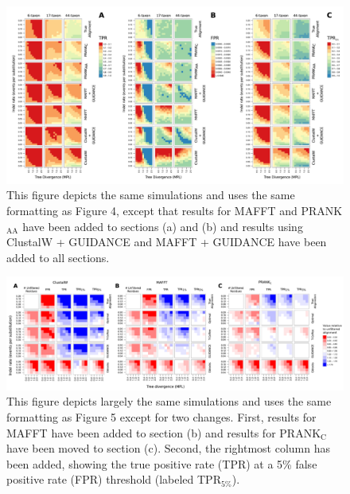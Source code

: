\documentclass{article}
\newcommand{\pranka}{PRANK$_{\textrm{AA}}$\xspace}
\newcommand{\prankc}{PRANK$_{\textrm{C}}$\xspace}
\newcommand{\tprf}{TPR$_{5\%}$\xspace}
\begin{document}
\makeatletter 
\renewcommand{\figurename}{Supplementary Figure}
\renewcommand{\thefigure}{S\@arabic\c@figure} 

\begin{figure}[t]
\begin{center}
\includegraphics[scale=0.7]{supp_fig1.pdf}
\end{center}
\caption{This figure depicts the same simulations and uses the same
  formatting as Figure 4, except that results for MAFFT and \pranka
  have been added to sections (a) and (b) and results using ClustalW +
  GUIDANCE and MAFFT + GUIDANCE have been added to all sections.}
\label{supp_fig1}
\end{figure}

\begin{figure}[t]
\begin{center}
\includegraphics[scale=0.55]{supp_fig2.pdf}
\end{center}
\caption{This figure depicts largely the same simulations and uses the
  same formatting as Figure 5 except for two changes. First,
  results for MAFFT have been added to section (b) and results for
  \prankc have been moved to section (c). Second, the rightmost column
  has been added, showing the true positive rate (TPR) at a 5\% false
  positive rate (FPR) threshold (labeled \tprf).}
\label{supp_fig2}
\end{figure}
\end{document}
